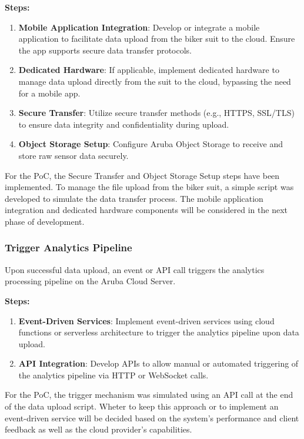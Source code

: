 \textbf{Steps:}
\begin{enumerate}
    \item \textbf{Mobile Application Integration}: Develop or integrate a mobile application to facilitate data upload from the biker suit to the cloud. Ensure the app supports secure data transfer protocols.
    \item \textbf{Dedicated Hardware}: If applicable, implement dedicated hardware to manage data upload directly from the suit to the cloud, bypassing the need for a mobile app.
    \item \textbf{Secure Transfer}: Utilize secure transfer methods (e.g., HTTPS, SSL/TLS) to ensure data integrity and confidentiality during upload.
    \item \textbf{Object Storage Setup}: Configure Aruba Object Storage to receive and store raw sensor data securely.
\end{enumerate}

For the PoC, the Secure Transfer and Object Storage Setup steps have been implemented. To manage the file upload from the biker suit, a simple script was developed to simulate the data transfer process. The mobile application integration and dedicated hardware components will be considered in the next phase of development.



\subsubsection{Trigger Analytics Pipeline}
Upon successful data upload, an event or API call triggers the analytics processing pipeline on the Aruba Cloud Server.

\textbf{Steps:}
\begin{enumerate}
    \item \textbf{Event-Driven Services}: Implement event-driven services using cloud functions or serverless architecture to trigger the analytics pipeline upon data upload.
    \item \textbf{API Integration}: Develop APIs to allow manual or automated triggering of the analytics pipeline via HTTP or WebSocket calls.
\end{enumerate}

For the PoC, the trigger mechanism was simulated using an API call at the end of the data upload script. Wheter to keep this approach or to implement an event-driven service will be decided based on the system's performance and client feedback as well as the cloud provider's capabilities.
